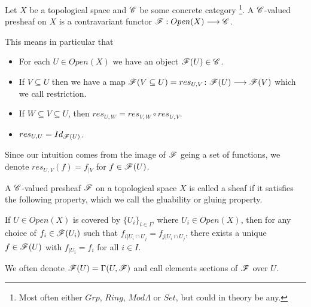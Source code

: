 \begin{definition}[Presheaf]
Let $X$ be a topological space and $\mathscr{C}$ be some concrete category \footnote{Most often either $Grp$, $Ring$, $Mod\Lambda$ or $Set$, but could in theory be any.}. A $\mathscr{C}$-valued presheaf on $X$ is a contravariant functor $\mathscr{F}:Open(X)\longrightarrow \mathscr{C}$.
\end{definition}

This means in particular that 
\begin{itemize}
    \item For each $U\in Open(X)$ we have an object $\mathscr{F}(U)\in \mathscr{C}$. 
    \item If $V\subseteq U$ then we have a map $\mathscr{F}(V\subseteq U)=res_{U,V}\colon\mathscr{F}(U)\longrightarrow \mathscr{F}(V)$ which we call restriction.
    \item If $W\subseteq V\subseteq U$, then $res_{U, W} = res_{V, W}\circ res_{U, V}$.
    \item $res_{U, U} = Id_{\mathscr{F}(U)}$. 
\end{itemize}

Since our intuition comes from the image of $\mathscr{F}$ geing a set of functions, we denote $res_{U, V}(f)=f_{\vert V}$ for $f\in \mathscr{F}(U)$. 

\begin{definition}[Sheaf]
A $\mathscr{C}$-valued presheaf $\mathscr{F}$ on a topological space $X$ is called a sheaf if it satisfies the following property, which we call the gluability or gluing property. 

If $U\in Open(X)$ is covered by $\{U_i\}_{i\in I}$, where $U_i\in Open(X)$, then for any choice of $f_i\in \mathscr{F}(U_i)$ such that $f_{i\vert U_i\cap U_j} = f_{j\vert U_i\cap U_j}$, there exists a unique $f\in \mathscr{F}(U)$ with $f_{\vert U_i}=f_i$ for all $i\in I$. 
\end{definition}

We often denote $\mathscr{F}(U) = \Gamma(U, \mathscr{F})$ and call elements sections of $\mathscr{F}$ over $U$. 

